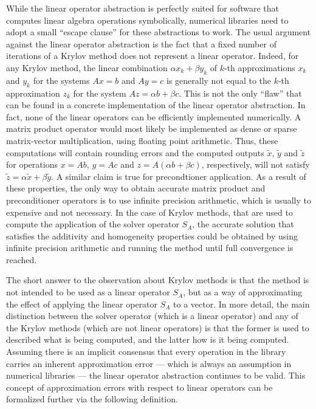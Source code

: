 While the linear operator abstraction is perfectly suited for software that
computes linear algebra operations symbolically, numerical libraries need to
adopt a small ``escape clause'' for these abstractions to work. The usual
argument against the linear operator abstraction is the fact that a fixed number
of iterations of a Krylov method does not represent a linear operator. Indeed,
for any Krylov method, the linear combination $\alpha x_k + \beta y_k$ of $k$-th
approximations $x_k$ and $y_k$ for the systems $Ax = b$ and $Ay = c$ is
generally not equal to the $k$-th approximation $z_k$ for the system $Az =
\alpha b + \beta c$. This is not the only ``flaw'' that can be found in a
concrete implementation of the linear operator abstraction. In fact, none of the
linear operators can be efficiently implemented numerically. A matrix product
operator would most likely be implemented as dense or sparse matrix-vector
multiplication, using floating point arithmetic. Thus, these computations will
contain rounding errors and the computed outputs $\widetilde{x}$,
$\widetilde{y}$ and $\widetilde{z}$ for operations $x = Ab$, $y = Ac$ and $z =
A(\alpha b + \beta c)$, respectively, will not satisfy $\widetilde{z} = \alpha
\widetilde{x} + \beta \widetilde{y}$. A similar claim is true for precondtioner
application. As a result of these properties, the only way to obtain accurate
matrix product and preconditioner operators is to use infinite precision
arithmetic, which is usually to expensive and not necessary. In the case of
Krylov methods, that are used to compute the application of the solver operator
$S_A$, the accurate solution that satisfies the additivity and homogeneity
properties could be obtained by using infinite precision arithmetic and running
the method until full convergence is reached.

The short answer to the observation about Krylov methods is that the method is
not intended to be used as a linear operator $S_A$, but as a way of
approximating the effect of applying the linear operator $S_A$ to a vector.
In more detail, the main distinction between the solver operator (which is a
linear operator) and any of the Krylov methods (which are not linear operators)
is that the former is used to described what is being computed, and the latter
how is it being computed. Assuming there is an implicit consensus that every
operation in the library carries an inherent approximation error --- which is
always an assumption in numerical libraries --- the linear operator abstraction
continues to be valid. This concept of approximation errors with respect to
linear operators can be formalized further via the following definition.


